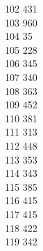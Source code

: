 { 102	431 \\
 103	960 \\
 104	35 \\
 105	228 \\
 106	345 \\
 107	340 \\
 108	363 \\
 109	452 \\
 110	381 \\
 111	313 \\
 112	448 \\
 113	353 \\
 114	343 \\
 115	385 \\
 116	415 \\
 117	415 \\
 118	422 \\
 119	342 \\
}
